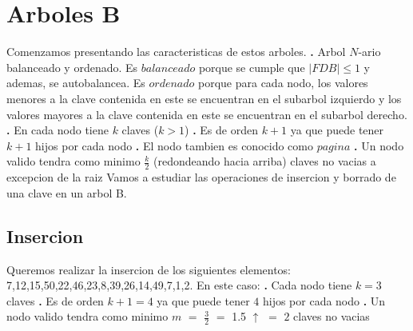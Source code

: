 \documentclass[10pt,a4paper]{article}
\begin{document}
\section{Arboles B}

Comenzamos presentando las caracteristicas de estos arboles.
\newline
\newline
\textbf{.} Arbol $N$-ario balanceado y ordenado. Es $balanceado$ porque se cumple que $|FDB| \leq 1$ y ademas, se autobalancea. Es $ordenado$ porque para cada nodo, los valores menores a la clave contenida en este se encuentran en el subarbol izquierdo y los valores mayores a la clave contenida en este se encuentran en el subarbol derecho.
\newline
\newline
\textbf{.} En cada nodo tiene $k$ claves ($k > 1$)
\newline
\newline
\textbf{.} Es de orden $k+1$ ya que puede tener $k+1$ hijos por cada nodo
\newline
\newline
\textbf{.} El nodo tambien es conocido como $pagina$
\newline
\newline
\textbf{.} Un nodo valido tendra como minimo $\displaystyle \frac{k}{2}$ (redondeando hacia arriba) claves no vacias a excepcion de la raiz
\newline
\newline
Vamos a estudiar las operaciones  de insercion y borrado de una clave en un arbol B.

\subsection{Insercion}

Queremos realizar la insercion de los siguientes elementos: 7,12,15,50,22,46,23,8,39,26,14,49,7,1,2.
\newline
\newline
En este caso:
\newline
\newline
\textbf{.} Cada nodo tiene $k = 3$ claves
\newline
\newline
\textbf{.} Es de orden $k+1 = 4$ ya que puede tener $4$ hijos por cada nodo
\newline
\newline
\textbf{.} Un nodo valido tendra como minimo $m$ $=$ $\displaystyle \frac{3}{2}$ $=$ 1.5 $\uparrow$ $=$ $2$ claves no vacias
\end{document}
